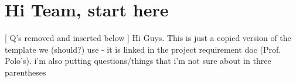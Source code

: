 \documentclass[sigconf,nonacm,11pt]{acmart}
\begin{document}




\maketitle

\section{Hi Team, start here}
[ Q's removed and inserted below ]
Hi Guys. This is just a copied version of the template we (should?) use - it is linked in the project requirement doc (Prof. Polo's).\newline
i'm also putting questions/things that i'm not sure about in three parentheses
\end{document}
